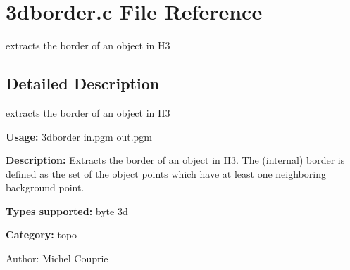 \section{3dborder.c File Reference}
\label{3dborder_8c}
extracts the border of an object in H3  




\label{_details}
\subsection{Detailed Description}
extracts the border of an object in H3 

{\bf Usage:} 3dborder in.pgm out.pgm

{\bf Description:} Extracts the border of an object in H3. The (internal) border is defined as the set of the object points which have at least one neighboring background point.

{\bf Types supported:} byte 3d

{\bf Category:} topo

\begin{Desc}
\item[Author:]Michel Couprie \end{Desc}

